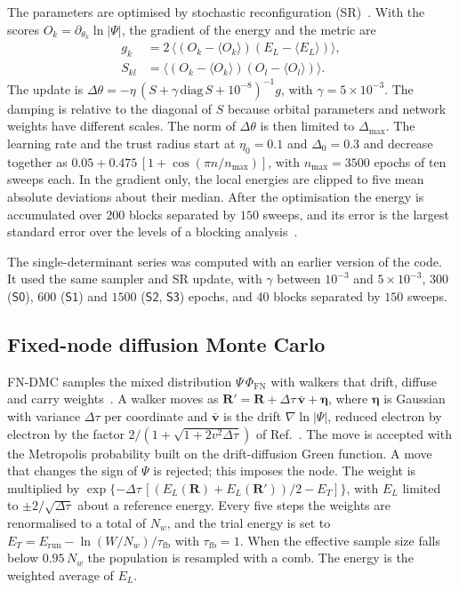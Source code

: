 \documentclass[aps,prb,reprint,amsmath,amssymb,superscriptaddress,nofootinbib]{revtex4-2}
\newcommand{\mS}[1]{\ensuremath{\textsf{S#1}}}
\begin{document}
The parameters are optimised by stochastic reconfiguration
(SR)~\cite{sorella1998}. With the scores
$O_k = \partial_{\theta_k} \ln|\Psi|$, the gradient of the energy and the
metric are
\begin{align}
    g_k &= 2\, \bigl\langle (O_k - \langle O_k\rangle)
                           (E_L - \langle E_L\rangle) \bigr\rangle ,
    \label{eq:gradient} \\
    S_{kl} &= \bigl\langle (O_k - \langle O_k\rangle)
                          (O_l - \langle O_l\rangle) \bigr\rangle .
    \label{eq:s_matrix}
\end{align}
The update is $\Delta\theta = -\eta\, (S + \gamma\,\mathrm{diag}\,S
+ 10^{-8})^{-1} g$, with $\gamma = 5\times10^{-3}$. The damping is relative
to the diagonal of $S$ because orbital parameters and network weights have
different scales. The norm of $\Delta\theta$ is then limited to
$\Delta_{\max}$. The learning rate and the trust radius start at
$\eta_0 = 0.1$ and $\Delta_0 = 0.3$ and decrease together as
$0.05 + 0.475\,[1 + \cos(\pi n/n_{\max})]$, with $n_{\max} = 3500$ epochs of
ten sweeps each. In the gradient only, the local energies are clipped to five
mean absolute deviations about their median. After the optimisation the
energy is accumulated over $200$ blocks separated by $150$ sweeps, and its
error is the largest standard error over the levels of a blocking
analysis~\cite{flyvbjerg1989}.

The single-determinant series was computed with an earlier version of the
code. It used the same sampler and SR update, with $\gamma$ between
$10^{-3}$ and $5\times10^{-3}$, $300$ (\mS{0}), $600$ (\mS{1}) and $1500$
(\mS{2}, \mS{3}) epochs, and $40$ blocks separated by $150$ sweeps.

\subsection{Fixed-node diffusion Monte Carlo}
\label{ssec:dmc_method}

FN-DMC samples the mixed distribution $\Psi\,\Phi_{\mathrm{FN}}$ with walkers
that drift, diffuse and carry weights~\cite{reynolds1982,foulkes2001}. A
walker moves as
$\mathbf{R}' = \mathbf{R} + \Delta\tau\, \bar{\mathbf{v}} + \bm{\eta}$, where
$\bm\eta$ is Gaussian with variance $\Delta\tau$ per coordinate and
$\bar{\mathbf{v}}$ is the drift $\nabla \ln|\Psi|$, reduced electron by
electron by the factor $2/(1 + \sqrt{1 + 2 v^2 \Delta\tau})$ of
Ref.~. The move is accepted with the Metropolis
probability built on the drift-diffusion Green function. A move that changes
the sign of $\Psi$ is rejected; this imposes the node. The weight is
multiplied by
$\exp\{-\Delta\tau\,[(E_L(\mathbf{R}) + E_L(\mathbf{R}'))/2 - E_T]\}$, with
$E_L$ limited to $\pm 2/\sqrt{\Delta\tau}$ about a reference energy. Every
five steps the weights are renormalised to a total of $N_w$, and the trial
energy is set to $E_T = E_{\mathrm{run}} - \ln(W/N_w)/\tau_{\mathrm{fb}}$
with $\tau_{\mathrm{fb}} = 1$. When the effective sample size falls below
$0.95\, N_w$ the population is resampled with a comb. The energy is the
weighted average of $E_L$.
\end{document}
